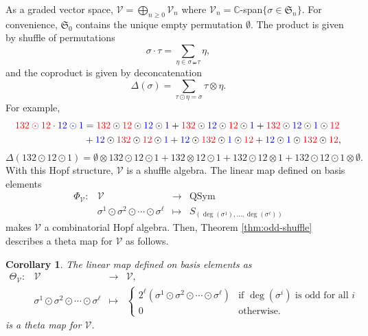\documentclass[12pt]{amsart}
\newtheorem{corollary}[theorem]{Corollary}
\numberwithin{equation}{section}
\newcommand{\fS}{\mathfrak{S}}
\newcommand{\QSym}{\mathrm{QSym}}
\newcommand{\cV}{\mathcal{V}}
\begin{document}
As a graded vector space, $\mathcal{V}=\displaystyle\bigoplus_{n\geq 0}\mathcal{V}_n$ where $\mathcal{V}_n=\mathbb{C}$-span$\{\sigma\in\mathfrak{S}_n\}$. For convenience, $\fS_0$ contains the unique empty permutation $\emptyset$. The product is given by shuffle of permutations
$$\sigma\cdot\tau=\sum_{\eta\in\sigma\shuffle\tau}\eta,$$
and the coproduct is given by deconcatenation
$$\Delta(\sigma)=\sum_{\tau\odot\eta=\sigma}\tau\otimes\eta.$$
For example,
\begin{align*}
	{\color{red}132\odot 12}\cdot{\color{blue}12\odot 1}&={\color{red}132}\odot{\color{red}12}\odot{\color{blue}12}\odot{\color{blue}1}+{\color{red}132}\odot{\color{blue}12}\odot{\color{red}12}\odot{\color{blue}1}+{\color{red}132}\odot{\color{blue}12}\odot{\color{blue}1}\odot{\color{red}12}\\
	&+{\color{blue}12}\odot{\color{red}132}\odot{\color{red}12}\odot{\color{blue}1}+{\color{blue}12}\odot{\color{red}132}\odot{\color{blue}1}\odot{\color{red}12}+{\color{blue}12}\odot{\color{blue}1}\odot{\color{red}132}\odot{\color{red}12},
\end{align*}
$$\Delta(132\odot 12\odot 1)=\emptyset\otimes 132\odot 12\odot 1+132\otimes 12\odot 1+132\odot 12\otimes 1+132\odot 12\odot 1\otimes\emptyset.$$
With this Hopf structure, $\cV$ is a shuffle algebra. The linear map defined on basis elements
$$\begin{array}{cccc}
	\Phi_{\cV}:&\cV&\rightarrow& \QSym\\
	&\sigma^1\odot\sigma^2\odot\cdots\odot\sigma^\ell& \mapsto & S_{(\deg(\sigma^1),\dots,\deg(\sigma^\ell))}
\end{array}$$
makes $\cV$ a combinatorial Hopf algebra. Then, Theorem \ref{thm:odd-shuffle} describes a theta map for $\cV$ as follows.

\begin{corollary}
The linear map defined on basis elements as
$$
\begin{array}{cccc} 
	\Theta_\cV:&\cV&\rightarrow& \cV,\\
	& \sigma^1\odot\sigma^2\odot\cdots\odot\sigma^\ell &\mapsto& \begin{cases} 
		2^\ell (\sigma^1\odot\sigma^2\odot\cdots\odot\sigma^\ell) & \text{if $\deg(\sigma^i)$ is odd for all $i$}\\
		0 & \text{otherwise.}
	\end{cases}
\end{array}
$$
is a theta map for $\cV$.
\end{corollary}
\end{document}
